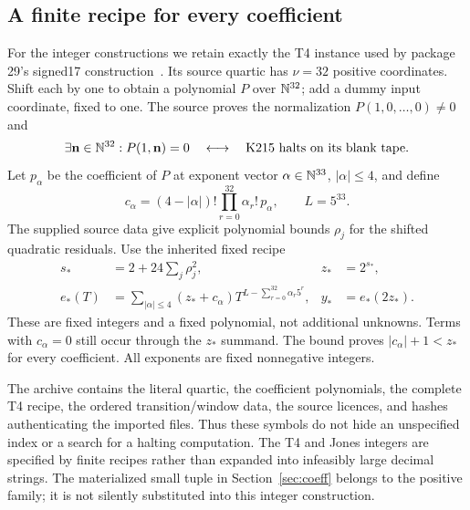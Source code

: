 \documentclass[11pt]{article}
\theoremstyle{definition}\newtheorem{definition}[theorem]{Definition}
\begin{document}
\subsection{A finite recipe for every coefficient}
For the integer constructions we retain exactly the T4 instance used by package 29's signed17 construction~\cite{signed17}. Its source quartic has $\nu=32$ positive coordinates. Shift each by one to obtain a polynomial $P$ over $\mathbb N^{32}$; add a dummy input coordinate, fixed to one. The source proves the normalization $P(1,0,\ldots,0)\ne0$ and
\[
 \exists\mathbf n\in\mathbb N^{32}:P(1,\mathbf n)=0
 \quad\longleftrightarrow\quad\text{K215 halts on its blank tape}.
\]
Let $p_\alpha$ be the coefficient of $P$ at exponent vector $\alpha\in\mathbb N^{33}$, $|\alpha|\le4$, and define
\[
 c_\alpha=(4-|\alpha|)!\prod_{r=0}^{32}\alpha_r!\,p_\alpha,
 \qquad L=5^{33}.
\]
The supplied source data give explicit polynomial bounds $\rho_j$ for the shifted quadratic residuals. Use the inherited fixed recipe
\begin{align*}
 s_*&=2+24\sum_j\rho_j^2,& z_*&=2^{s_*},\\
 e_*(T)&=\sum_{|\alpha|\le4}(z_*+c_\alpha)
       T^{L-\sum_{r=0}^{32}\alpha_r5^r},& y_*&=e_*(2z_*).
\end{align*}
These are fixed integers and a fixed polynomial, not additional unknowns. Terms with $c_\alpha=0$ still occur through the $z_*$ summand. The bound proves $|c_\alpha|+1<z_*$ for every coefficient. All exponents are fixed nonnegative integers.

The archive contains the literal quartic, the coefficient polynomials, the complete T4 recipe, the ordered transition/window data, the source licences, and hashes authenticating the imported files. Thus these symbols do not hide an unspecified index or a search for a halting computation. The T4 and Jones integers are specified by finite recipes rather than expanded into infeasibly large decimal strings. The materialized small tuple in Section~\ref{sec:coeff} belongs to the positive family; it is not silently substituted into this integer construction.
\end{document}
